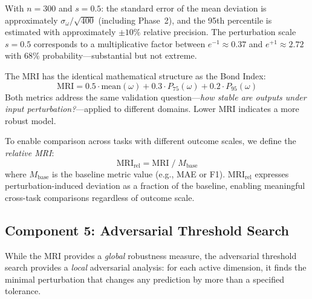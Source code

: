 \documentclass[manuscript,review,anonymous]{acmart}
\newcommand{\MRI}{\mathrm{MRI}}
\begin{document}
With $n = 300$ and $s = 0.5$: the standard error of the mean deviation is approximately $\sigma_\omega / \sqrt{400}$ (including Phase~2), and the 95th percentile is estimated with approximately $\pm 10\%$ relative precision.
The perturbation scale $s = 0.5$ corresponds to a multiplicative factor between $e^{-1} \approx 0.37$ and $e^{+1} \approx 2.72$ with 68\% probability---substantial but not extreme.

The MRI has the identical mathematical structure as the Bond Index:
\begin{equation}
    \MRI = 0.5 \cdot \mathrm{mean}(\omega) + 0.3 \cdot P_{75}(\omega) + 0.2 \cdot P_{95}(\omega)
    \label{eq:mri}
\end{equation}
Both metrics address the same validation question---\emph{how stable are outputs under input perturbation?}---applied to different domains.
Lower MRI indicates a more robust model.

To enable comparison across tasks with different outcome scales, we define the \emph{relative MRI}:
\begin{equation}
    \MRI_{\mathrm{rel}} = \MRI \;/\; M_{\mathrm{base}}
    \label{eq:mri_rel}
\end{equation}
where $M_{\mathrm{base}}$ is the baseline metric value (e.g., MAE or F1).
$\MRI_{\mathrm{rel}}$ expresses perturbation-induced deviation as a fraction of the baseline, enabling meaningful cross-task comparisons regardless of outcome scale.

\subsection{Component 5: Adversarial Threshold Search}

While the MRI provides a \emph{global} robustness measure, the adversarial threshold search provides a \emph{local} adversarial analysis: for each active dimension, it finds the minimal perturbation that changes any prediction by more than a specified tolerance.
\end{document}
